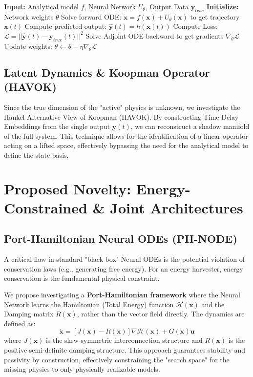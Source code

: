 \documentclass[11pt]{article}
\begin{document}
\begin{algorithm}
\caption{Training UDE with Partial Observability (Adjoint Method)}
\begin{algorithmic}[1]
\STATE \textbf{Input:} Analytical model $f$, Neural Network $U_\theta$, Output Data $\mathbf{y}_{true}$
\STATE \textbf{Initialize:} Network weights $\theta$
    \STATE Solve forward ODE: $\dot{\mathbf{x}} = f(\mathbf{x}) + U_\theta(\mathbf{x})$ to get trajectory $\mathbf{x}(t)$
    \STATE Compute predicted output: $\hat{\mathbf{y}}(t) = h(\mathbf{x}(t))$
    \STATE Compute Loss: $\mathcal{L} = ||\hat{\mathbf{y}}(t) - \mathbf{y}_{true}(t)||^2$
    \STATE Solve Adjoint ODE backward to get gradients $\nabla_\theta \mathcal{L}$
    \STATE Update weights: $\theta \leftarrow \theta - \eta \nabla_\theta \mathcal{L}$
\ENDWHILE
\end{algorithmic}
\end{algorithm}

\subsection{Latent Dynamics \& Koopman Operator (HAVOK)}
Since the true dimension of the "active" physics is unknown, we investigate the Hankel Alternative View of Koopman (HAVOK). By constructing Time-Delay Embeddings from the single output $\mathbf{y}(t)$, we can reconstruct a shadow manifold of the full system. This technique allows for the identification of a linear operator acting on a lifted space, effectively bypassing the need for the analytical model to define the state basis.

\section{Proposed Novelty: Energy-Constrained \& Joint Architectures}

\subsection{Port-Hamiltonian Neural ODEs (PH-NODE)}
A critical flaw in standard "black-box" Neural ODEs is the potential violation of conservation laws (e.g., generating free energy). For an energy harvester, energy conservation is the fundamental physical constraint.

We propose investigating a \textbf{Port-Hamiltonian framework} where the Neural Network learns the Hamiltonian (Total Energy) function $\mathcal{H}(\mathbf{x})$ and the Damping matrix $R(\mathbf{x})$, rather than the vector field directly. The dynamics are defined as:
\begin{equation}
    \dot{\mathbf{x}} = [J(\mathbf{x}) - R(\mathbf{x})] \nabla \mathcal{H}(\mathbf{x}) + G(\mathbf{x})\mathbf{u}
\end{equation}
where $J(\mathbf{x})$ is the skew-symmetric interconnection structure and $R(\mathbf{x})$ is the positive semi-definite damping structure. This approach guarantees stability and passivity by construction, effectively constraining the "search space" for the missing physics to only physically realizable models.
\end{document}
